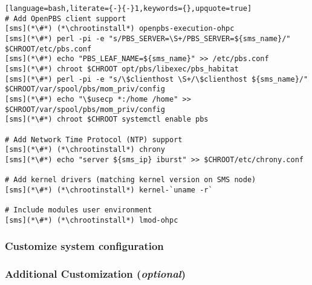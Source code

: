 \documentclass[letterpaper]{article}
\newcommand{\chrootinstall}{yum -y --installroot=\$CHROOT install}
\begin{document}
\begin{lstlisting}[language=bash,literate={-}{-}1,keywords={},upquote=true]
# Add OpenPBS client support
[sms](*\#*) (*\chrootinstall*) openpbs-execution-ohpc
[sms](*\#*) perl -pi -e "s/PBS_SERVER=\S+/PBS_SERVER=${sms_name}/" $CHROOT/etc/pbs.conf
[sms](*\#*) echo "PBS_LEAF_NAME=${sms_name}" >> /etc/pbs.conf
[sms](*\#*) chroot $CHROOT opt/pbs/libexec/pbs_habitat
[sms](*\#*) perl -pi -e "s/\$clienthost \S+/\$clienthost ${sms_name}/" $CHROOT/var/spool/pbs/mom_priv/config
[sms](*\#*) echo "\$usecp *:/home /home" >> $CHROOT/var/spool/pbs/mom_priv/config
[sms](*\#*) chroot $CHROOT systemctl enable pbs

# Add Network Time Protocol (NTP) support
[sms](*\#*) (*\chrootinstall*) chrony
[sms](*\#*) echo "server ${sms_ip} iburst" >> $CHROOT/etc/chrony.conf

# Add kernel drivers (matching kernel version on SMS node)
[sms](*\#*) (*\chrootinstall*) kernel-`uname -r`

# Include modules user environment
[sms](*\#*) (*\chrootinstall*) lmod-ohpc
\end{lstlisting}

\subsubsection{Customize system configuration} \label{sec:master_customization}



\subsubsection{Additional Customization ({\em optional})} \label{sec:addl_customizations}



\end{document}
